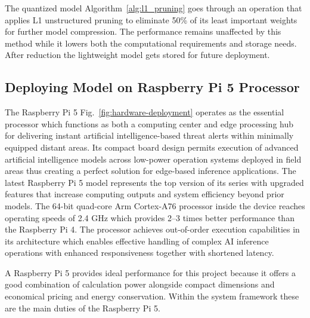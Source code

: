 \documentclass[fleqn,10pt,lineno]{wlpeerj}
\begin{document}


The quantized model Algorithm~\ref{alg:l1_pruning} goes through an operation that applies L1 unstructured pruning to eliminate 50\% of its least important weights for further model compression. The performance remains unaffected by this method while it lowers both the computational requirements and storage needs. After reduction the lightweight model gets stored for future deployment. 

\subsection{Deploying Model on Raspberry Pi 5 Processor}

The Raspberry Pi 5 Fig.~\ref{fig:hardware-deployment} operates as the essential processor which functions as both a computing center and edge processing hub for delivering instant artificial intelligence-based threat alerts within minimally equipped distant areas. Its compact board design permits execution of advanced artificial intelligence models across low-power operation systems deployed in field areas thus creating a perfect solution for edge-based inference applications. The latest Raspberry Pi 5 model represents the top version of its series with upgraded features that increase computing outputs and system efficiency beyond prior models. The 64-bit quad-core Arm Cortex-A76 processor inside the device reaches operating speeds of 2.4 GHz which provides 2–3 times better performance than the Raspberry Pi 4. The processor achieves out-of-order execution capabilities in its architecture which enables effective handling of complex AI inference operations with enhanced responsiveness together with shortened latency.

A Raspberry Pi 5 provides ideal performance for this project because it offers a good combination of calculation power alongside compact dimensions and economical pricing and energy conservation. Within the system framework these are the main duties of the Raspberry Pi 5.
\end{document}
